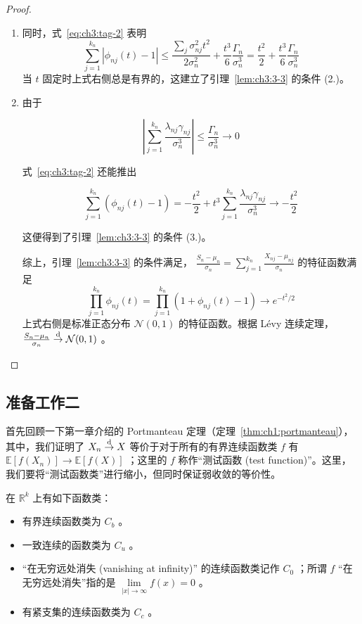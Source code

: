 \begin{proof}
\begin{enumerate}[label=\textbf{第\chinese*步}:, leftmargin=6em]
\item 同时，式~\eqref{eq:ch3:tag-2} 表明
\[\sum_{j = 1}^{k_n}|\phi_{nj}(t) - 1|\leq \frac{\sum_j\sigma_{nj}^2t^2}{2\sigma_n^2} +\frac{t^3}{6}\frac{\Gamma_n}{\sigma_n^3} = \frac{t^2}2 +\frac{t^3}{6}\frac{\Gamma_n}{\sigma_n^3}\]
当 $t$ 固定时上式右侧总是有界的，这建立了引理~\ref{lem:ch3:3-3} 的条件 (2.)。

\item 由于

$$\left|\sum_{j = 1}^{k_n}\frac{\lambda_{nj}\gamma_{nj}}{\sigma_n^3}\right|\leq \frac{\Gamma_n}{\sigma_n^3}\to 0$$

式~\eqref{eq:ch3:tag-2} 还能推出 

$$\sum_{j = 1}^{k_n}(\phi_{nj}(t) - 1) = -\frac{t^2}2 +t^3\sum_{j = 1}^{k_n}\frac{\lambda_{nj}\gamma_{nj}}{\sigma_n^3}\rightarrow -\frac{t^2}2$$

这便得到了引理~\ref{lem:ch3:3-3} 的条件 (3.)。

综上，引理~\ref{lem:ch3:3-3} 的条件满足， $\frac{S_n - \mu_n}{\sigma_n }= \sum_{j = 1}^{k_n}\frac{X_{nj} - \mu_{nj}}{\sigma_n}$ 的特征函数满足
\[\prod_{j = 1}^{k_n}\phi_{nj}(t) = \prod_{j = 1}^{k_n}(1 + \phi_{nj}(t) - 1)\rightarrow e^{-t^2 / 2}\]
上式右侧是标准正态分布 $\mathcal N(0,1)$ 的特征函数。根据 Lévy 连续定理， $\frac{S_n - \mu_n}{\sigma_n }\overset{\rm d}\to \mathcal N(0,1)$ 。

\end{enumerate}

\end{proof}

\subsection{准备工作二}

首先回顾一下第一章介绍的 Portmanteau 定理（定理~\ref{thm:ch1:portmanteau}），其中，我们证明了 $X_n\overset{\rm d}\to X$ 等价于对于所有的有界连续函数类 $f$ 有 $\mathbb{E}[f(X_n)]\to \mathbb{E}[f(X)]$ ；这里的 $f$ 称作``测试函数 (test function)''。这里，我们要将``测试函数类''进行缩小，但同时保证弱收敛的等价性。

在 $\mathbb R^k$ 上有如下函数类：

\begin{itemize}
\tightlist
\item
  有界连续函数类为 $C_b$ 。
\item
  一致连续的函数类为 $C_u$ 。
\item
  ``在无穷远处消失 (vanishing at infinity)'' 的连续函数类记作 $C_0$ ；所谓 $f$ ``在无穷远处消失''指的是 $\lim\limits_{|x|\to\infty}f(x)=0$ 。
\item
  有紧支集的连续函数类为 $C_c$ 。
\end{itemize}

